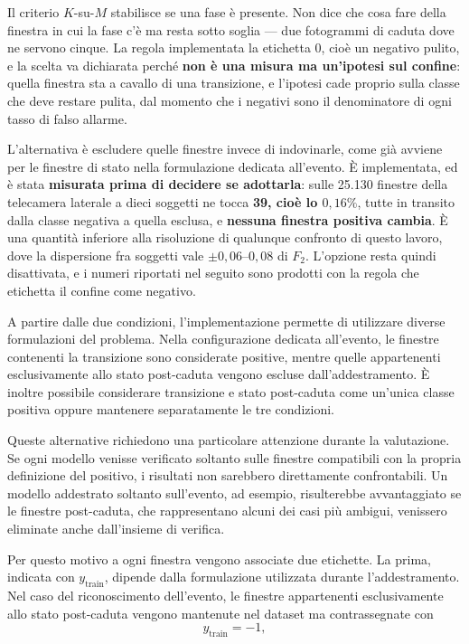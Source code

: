 Il criterio $K$-su-$M$ stabilisce se una fase è presente. Non dice che cosa fare della finestra in cui la fase c'è ma resta sotto soglia --- due fotogrammi di caduta dove ne servono cinque. La regola implementata la etichetta $0$, cioè un negativo pulito, e la scelta va dichiarata perché \textbf{non è una misura ma un'ipotesi sul confine}: quella finestra sta a cavallo di una transizione, e l'ipotesi cade proprio sulla classe che deve restare pulita, dal momento che i negativi sono il denominatore di ogni tasso di falso allarme.

L'alternativa è escludere quelle finestre invece di indovinarle, come già avviene per le finestre di stato nella formulazione dedicata all'evento. È implementata, ed è stata \textbf{misurata prima di decidere se adottarla}: sulle 25.130 finestre della telecamera laterale a dieci soggetti ne tocca \textbf{39, cioè lo $0{,}16\%$}, tutte in transito dalla classe negativa a quella esclusa, e \textbf{nessuna finestra positiva cambia}. È una quantità inferiore alla risoluzione di qualunque confronto di questo lavoro, dove la dispersione fra soggetti vale $\pm 0{,}06$--$0{,}08$ di $F_2$. L'opzione resta quindi disattivata, e i numeri riportati nel seguito sono prodotti con la regola che etichetta il confine come negativo.

\bigskip

A partire dalle due condizioni, l'implementazione permette di utilizzare diverse formulazioni del problema. Nella configurazione dedicata all'evento, le finestre contenenti la transizione sono considerate positive, mentre quelle appartenenti esclusivamente allo stato post-caduta vengono escluse dall'addestramento. È inoltre possibile considerare transizione e stato post-caduta come un'unica classe positiva oppure mantenere separatamente le tre condizioni.

Queste alternative richiedono una particolare attenzione durante la valutazione. Se ogni modello venisse verificato soltanto sulle finestre compatibili con la propria definizione del positivo, i risultati non sarebbero direttamente confrontabili. Un modello addestrato soltanto sull'evento, ad esempio, risulterebbe avvantaggiato se le finestre post-caduta, che rappresentano alcuni dei casi più ambigui, venissero eliminate anche dall'insieme di verifica.

Per questo motivo a ogni finestra vengono associate due etichette. La prima, indicata con $y_{\text{train}}$, dipende dalla formulazione utilizzata durante l'addestramento. Nel caso del riconoscimento dell'evento, le finestre appartenenti esclusivamente allo stato post-caduta vengono mantenute nel dataset ma contrassegnate con
\[
y_{\text{train}}=-1,
\]

